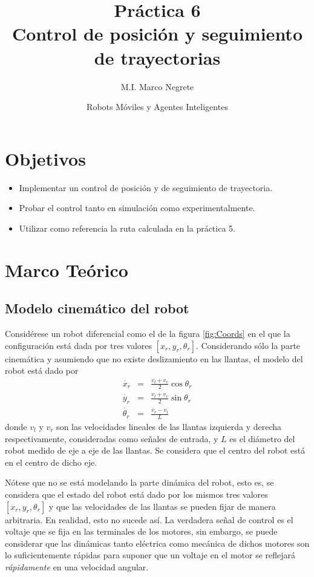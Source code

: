 \documentclass[letterpaper,12pt]{article}
\title{Práctica 6  \\ Control de posición y seguimiento de trayectorias}
\author{M.I. Marco Negrete}
\date{Robots Móviles y Agentes Inteligentes}
\begin{document}
\renewcommand{\tablename}{Tabla}
\maketitle
\section*{Objetivos}
\begin{itemize}
\item Implementar un control de posición y de seguimiento de trayectoria. 
\item Probar el control tanto en simulación como experimentalmente.
\item Utilizar como referencia la ruta calculada en la práctica 5.
\end{itemize}

\section{Marco Teórico}
\subsection{Modelo cinemático del robot}
Considérese un robot diferencial como el de la figura \ref{fig:Coords} en el que la configuración está dada por tres valores $\left[x_r, y_r, \theta_r\right]$. Considerando sólo la parte cinemática y asumiendo que no existe deslizamiento en las llantas, el modelo del robot está dado por
\begin{eqnarray}                                                                                                                        
\dot{x_r} &=& \frac{v_l + v_r}{2}\cos\theta_r\label{eq:Kinematic1}\\                                                                        
\dot{y_r} &=& \frac{v_l + v_r}{2}\sin\theta_r\\                                                                                             
\dot{\theta_r} &=& \frac{v_r - v_l}{L}\label{eq:Kinematic3}                                                                               
\end{eqnarray}
donde $v_l$ y $v_r$ son las velocidades lineales de las llantas izquierda y derecha respectivamente, consideradas como señales de entrada, y $L$ es el diámetro del robot medido de eje a eje de las llantas. Se considera que el centro del robot está en el centro de dicho eje.

Nótese que no se está modelando la parte dinámica del robot, esto es, se considera que el estado del robot está dado por los mismos tres valores $\left[x_r, y_r, \theta_r\right]$ y que las velocidades de las llantas se pueden fijar de manera arbitraria. En realidad, esto no sucede así. La verdadera señal de control es el voltaje que se fija en las terminales de los motores, sin embargo, se puede considerar que las dinámicas tanto eléctrica como mecánica de dichos motores son lo suficientemente rápidas para suponer que un voltaje en el motor se reflejará \textit{rápidamente} en una velocidad angular.
\end{document}
